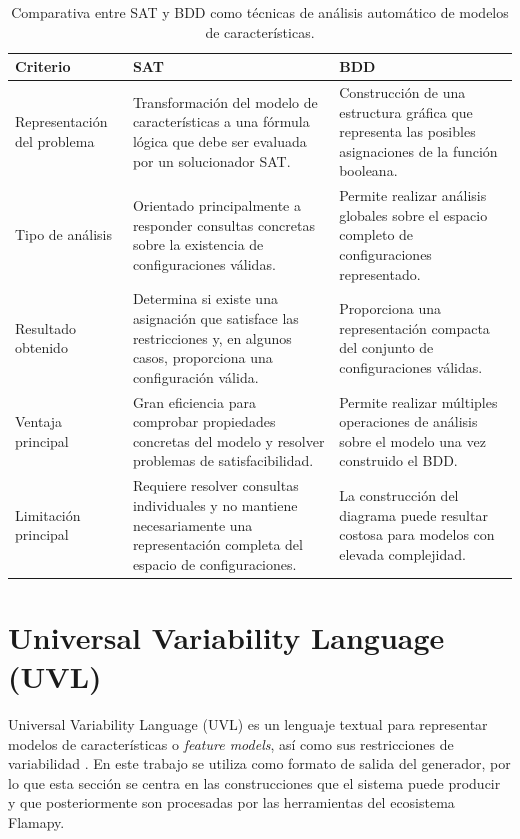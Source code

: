 \begin{table}[H]
    \centering
    \begin{tabular}{>{\raggedright\arraybackslash}p{4cm}
                    >{\raggedright\arraybackslash}p{5cm}
                    >{\raggedright\arraybackslash}p{5cm}}
        \toprule
        \textbf{Criterio} & \textbf{SAT} & \textbf{BDD} \\
        \midrule
        Representación del problema &
        Transformación del modelo de características a una fórmula lógica que debe ser evaluada por un solucionador SAT. &
        Construcción de una estructura gráfica que representa las posibles asignaciones de la función booleana. \\
        \midrule
        Tipo de análisis &
        Orientado principalmente a responder consultas concretas sobre la existencia de configuraciones válidas. &
        Permite realizar análisis globales sobre el espacio completo de configuraciones representado. \\
        \midrule
        Resultado obtenido &
        Determina si existe una asignación que satisface las restricciones y, en algunos casos, proporciona una configuración válida. &
        Proporciona una representación compacta del conjunto de configuraciones válidas. \\
        \midrule
        Ventaja principal &
        Gran eficiencia para comprobar propiedades concretas del modelo y resolver problemas de satisfacibilidad. &
        Permite realizar múltiples operaciones de análisis sobre el modelo una vez construido el BDD. \\
        \midrule
        Limitación principal &
        Requiere resolver consultas individuales y no mantiene necesariamente una representación completa del espacio de configuraciones. &
        La construcción del diagrama puede resultar costosa para modelos con elevada complejidad. \\
        \bottomrule
    \end{tabular}
    \caption{Comparativa entre SAT y BDD como técnicas de análisis automático de modelos de características.}
    \label{tab:sat_vs_bdd}
\end{table}


\section{Universal Variability Language (UVL)}
\label{sec:uvl}

Universal Variability Language (UVL) es un lenguaje textual para representar
modelos de características o \textit{feature models}, así como sus
restricciones de variabilidad \cite{uvl,uvlparser2023}. En este trabajo se
utiliza como formato de salida del generador, por lo que esta sección se centra
en las construcciones que el sistema puede producir y que posteriormente son
procesadas por las herramientas del ecosistema Flamapy.

